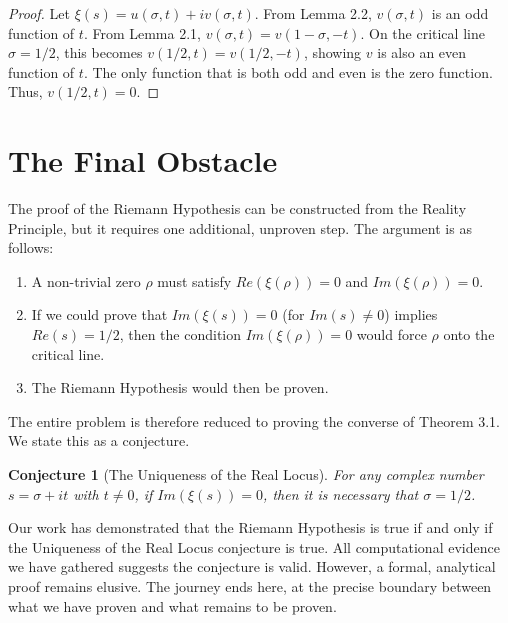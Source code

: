\documentclass{article}
\newtheorem{conjecture}[theorem]{Conjecture}
\begin{document}
\begin{proof}
Let $\xi(s) = u(\sigma, t) + i v(\sigma, t)$. From Lemma 2.2, $v(\sigma, t)$ is an odd function of $t$. From Lemma 2.1, $v(\sigma, t) = v(1-\sigma, -t)$. On the critical line $\sigma=1/2$, this becomes $v(1/2, t) = v(1/2, -t)$, showing $v$ is also an even function of $t$. The only function that is both odd and even is the zero function. Thus, $v(1/2, t) = 0$.
\end{proof}

\section{The Final Obstacle}
The proof of the Riemann Hypothesis can be constructed from the Reality Principle, but it requires one additional, unproven step. The argument is as follows:
\begin{enumerate}
    \item A non-trivial zero $\rho$ must satisfy $Re(\xi(\rho))=0$ and $Im(\xi(\rho))=0$.
    \item If we could prove that $Im(\xi(s))=0$ (for $Im(s)\neq0$) implies $Re(s)=1/2$, then the condition $Im(\xi(\rho))=0$ would force $\rho$ onto the critical line.
    \item The Riemann Hypothesis would then be proven.
\end{enumerate}
The entire problem is therefore reduced to proving the converse of Theorem 3.1. We state this as a conjecture.

\begin{conjecture}[The Uniqueness of the Real Locus]
For any complex number $s = \sigma + it$ with $t \neq 0$, if $Im(\xi(s))=0$, then it is necessary that $\sigma = 1/2$.
\end{conjecture}

Our work has demonstrated that the Riemann Hypothesis is true if and only if the Uniqueness of the Real Locus conjecture is true. All computational evidence we have gathered suggests the conjecture is valid. However, a formal, analytical proof remains elusive. The journey ends here, at the precise boundary between what we have proven and what remains to be proven.
\end{document}
